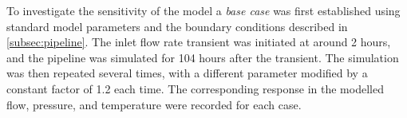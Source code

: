 To investigate the sensitivity of the model a \emph{base case} was first established using standard model parameters and the boundary conditions described in \cref{subsec:pipeline}. The inlet flow rate transient was initiated at around 2 hours, and the pipeline was simulated for 104 hours after the transient.
%
The simulation was then repeated several times, with a different parameter modified by a constant factor of 1.2 each time. The corresponding response in the modelled flow, pressure, and temperature were recorded for each case. 

